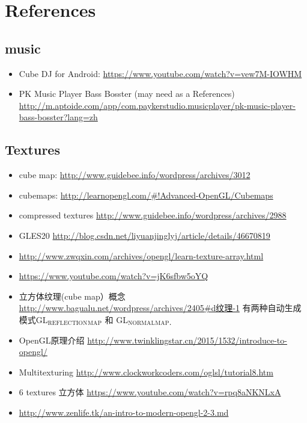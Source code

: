 \documentclass[9pt,b5paper]{article}
\begin{document}
\section{References}
\label{sec-2}
\subsection{music}
\label{sec-2-1}
\begin{itemize}
\item Cube DJ for Android: \url{https://www.youtube.com/watch?v=vew7M-IOWHM}
\item PK Music Player Bass Bosster (may need as a References) \url{http://m.aptoide.com/app/com.paykerstudio.musicplayer/pk-music-player-bass-bosster?lang=zh}
\end{itemize}
\subsection{Textures}
\label{sec-2-2}
\begin{itemize}
\item cube map: \url{http://www.guidebee.info/wordpress/archives/3012}
\item cubemaps: \url{http://learnopengl.com/#!Advanced-OpenGL/Cubemaps}
\item compressed textures \url{http://www.guidebee.info/wordpress/archives/2988}
\item GLES20 \url{http://blog.csdn.net/liyuanjinglyj/article/details/46670819}
\item \url{http://www.zwqxin.com/archives/opengl/learn-texture-array.html}
\item \url{https://www.youtube.com/watch?v=jK6sfbw5oYQ}
\item 立方体纹理(cube map）概念 \url{http://www.bagualu.net/wordpress/archives/2405#d纹理-1} 
  有两种自动生成模式GL$_{\text{REFLECTION}}$$_{\text{MAP}}$ 和 GL$_{\text{NORMAL}}$$_{\text{MAP．}}$
\item OpenGL原理介绍 \url{http://www.twinklingstar.cn/2015/1532/introduce-to-opengl/}
\item Multitexturing \url{http://www.clockworkcoders.com/oglsl/tutorial8.htm}
\item 6 textures 立方体 \url{https://www.youtube.com/watch?v=rpq8aNKNLxA}
\item \url{http://www.zenlife.tk/an-intro-to-modern-opengl-2-3.md}
\end{itemize}
\end{document}
